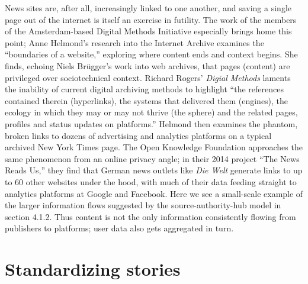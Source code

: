 News sites are, after all, increasingly linked to one another, and saving a single page out of the internet is itself an exercise in futility. The work of the members of the Amsterdam-based Digital Methods Initiative especially brings home this point; Anne Helmond's research into the Internet Archive examines the ``boundaries of a website,'' exploring where content ends and context begins. She finds, echoing Niels Br\"{u}gger's work into web archives, that pages (content) are privileged over sociotechnical context. Richard Rogers' \emph{Digial Methods} laments the inability of current digital archiving methods to highlight ``the references contained therein (hyperlinks), the systems that delivered them (engines), the ecology in which they may or may not thrive (the sphere) and the related pages, profiles and status updates on platforms.''\autocites{helmond_exploring_2013}{rogers_digital_2013} Helmond then examines the phantom, broken links to dozens of advertising and analytics platforms on a typical archived New York Times page. The Open Knowledge Foundation approaches the same phenomenon from an online privacy angle; in their 2014 project ``The News Reads Us,'' they find that German news outlets like \emph{Die Welt} generate links to up to 60 other websites under the hood, with much of their data feeding straight to analytics platforms at Google and Facebook.\autocite{wehrmeyer_news_????} Here we see a small-scale example of the larger information flows suggested by the source-authority-hub model in section 4.1.2. Thus content is not the only information consistently flowing from publishers to platforms; user data also gets aggregated in turn.

\section{Standardizing stories}

